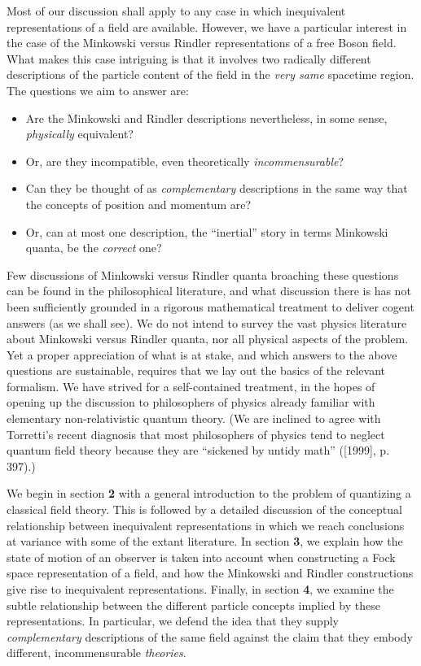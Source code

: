 \documentclass[12pt]{article}
\theoremstyle{remark}
\theoremstyle{definition}
\begin{document}
Most of our discussion shall apply to any case in which inequivalent
representations of a field are available.  However, we have a
particular interest in the case of the Minkowski versus Rindler
representations of a free Boson field.  What makes this case
intriguing is that it involves two radically different descriptions of
the particle content of the field in the \emph{very same} spacetime
region.  The questions we aim to answer are:
\begin{itemize}
\item Are the Minkowski and Rindler descriptions nevertheless, in some sense, \emph{physically}
equivalent?  
\item Or, are they incompatible, even theoretically \emph{incommensurable}?  
\item Can they be thought of
as \emph{complementary} descriptions in the same way that the concepts of position
and momentum are?  
\item Or, can at most one description, the ``inertial'' story in terms
  Minkowski quanta, be the \emph{correct} one?
\end{itemize} 

Few discussions of Minkowski versus Rindler quanta broaching these
questions can be found in the philosophical literature, and what
discussion there is has not been sufficiently grounded in a rigorous
mathematical treatment to deliver cogent answers (as we shall see).
We do not intend to survey the vast physics literature about Minkowski
versus Rindler quanta, nor all physical aspects of the problem.  Yet a
proper appreciation of what is at stake, and which answers to the
above questions are sustainable, requires that we lay out the basics
of the relevant formalism. We have strived for a self-contained
treatment, in the hopes of opening up the discussion to philosophers
of physics already familiar with elementary non-relativistic quantum
theory. (We are inclined to agree with Torretti's recent diagnosis
that most philosophers of physics tend to neglect quantum field theory
because they are ``sickened by untidy math'' ([1999], p.  397).)
 
We begin in section \textbf{2} with a general introduction to the
problem of quantizing a classical field theory.  This is followed by a
detailed discussion of the conceptual relationship between
inequivalent representations in which we reach conclusions at variance
with some of the extant literature.  In section \textbf{3}, we explain
how the state of motion of an observer is taken into account when
constructing a Fock space representation of a field, and how the
Minkowski and Rindler constructions give rise to inequivalent
representations.  Finally, in section \textbf{4}, we examine the
subtle relationship between the different particle concepts implied by
these representations.  In particular, we defend the idea that they
supply \emph{complementary} descriptions of the same field against the
claim that they embody different, incommensurable \emph{theories}.
 
\end{document}
